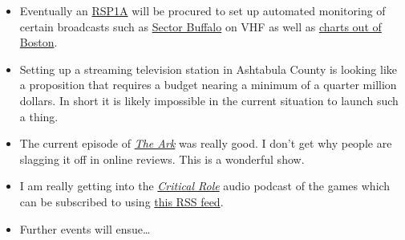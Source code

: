 \begin{itemize}
{  Radiogram} tomorrow.
\item
  Eventually an \href{https://www.sdrplay.com/rsp1a/}{RSP1A} will be
  procured to set up automated monitoring of certain broadcasts such as
  \href{https://www.weather.gov/marine/uscg_broadcasts}{Sector Buffalo}
  on VHF as well as \href{https://www.weather.gov/marine/marsh}{charts
  out of Boston}.
\item
  Setting up a streaming television station in Ashtabula County is
  looking like a proposition that requires a budget nearing a minimum of
  a quarter million dollars. In short it is likely impossible in the
  current situation to launch such a thing.\\
\item
  The current episode of
  \href{https://www.electricnow.tv/shows/ark/season/1/episode/7}{\emph{The
  Ark}} was really good. I don't get why people are slagging it off in
  online reviews. This is a wonderful show.
\item
  I am really getting into the
  \href{https://critrole.com}{\emph{Critical Role}} audio podcast of the
  games which can be subscribed to using
  \href{https://feeds.simplecast.com/LXz4Q9rJ}{this RSS feed}.
\item
  Further events will ensue\ldots{}
\end{itemize}
